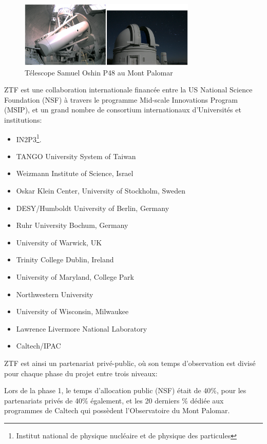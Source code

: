 \documentclass[../main/main.tex]{subfiles}
\begin{document}
\begin{figure}[h]
  \centering
  \includegraphics[width=0.75\textwidth]{../figures/02_ztf/p48.png}
  \caption{Télescope Samuel Oshin P48 au Mont Palomar}
  \label{fig:p48}
\end{figure}

ZTF est une collaboration internationale financée entre
la US National Science Foundation (NSF) à travers le  programme Mid-scale
Innovations Program (MSIP), et un grand nombre de consortium
internationaux d'Universités et institutions:

\begin{multicols}{2}
\begin{itemize}[noitemsep, label=$\bullet$]
    \item IN2P3\footnote{Institut national de physique nucléaire et de physique
    des particules}.
    \item TANGO University System of Taiwan
    \item Weizmann Institute of Science, Israel
    \item Oskar Klein Center, University of Stockholm, Sweden
    \item DESY/Humboldt University of Berlin, Germany
    \item Ruhr University Bochum, Germany
    \item University of Warwick, UK
    \item Trinity College Dublin, Ireland
    \item University of Maryland, College Park
    \item Northwestern University
    \item University of Wisconsin, Milwaukee
    \item Lawrence Livermore National Laboratory
    \item Caltech/IPAC
\end{itemize}
\end{multicols}

ZTF est ainsi un partenariat privé-public, où son temps d'observation
est divisé pour chaque phase du projet entre trois niveaux:

Lors de la phase 1, le temps d'allocation public (NSF) était de 40\%,
pour les partenariats privés de 40\% également, et les 20 derniers \%
dédiée aux programmes de Caltech qui possèdent l'Observatoire du Mont
Palomar.
\end{document}
